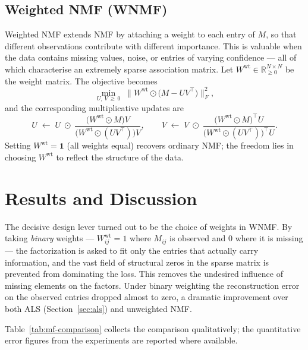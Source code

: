 \subsection{Weighted NMF (WNMF)}
\label{sec:wnmf}
Weighted NMF extends NMF by attaching a weight to each entry of $M$, so that
different observations contribute with different importance. This is valuable
when the data contains missing values, noise, or entries of varying
confidence --- all of which characterise an extremely sparse association
matrix. Let $W^{\mathrm{wt}} \in \mathbb{R}^{N\times N}_{\ge 0}$ be the weight
matrix. The objective becomes
\begin{equation}
  \label{eq:wnmf-obj}
  \min_{U,\,V \,\ge\, 0}\;
    \bigl\| W^{\mathrm{wt}} \odot \bigl(M - U V^{\top}\bigr) \bigr\|_{F}^{2},
\end{equation}
and the corresponding multiplicative updates are
\begin{equation}
  \label{eq:wnmf-update}
  U \;\leftarrow\; U \;\odot\;
    \frac{\bigl(W^{\mathrm{wt}}\odot M\bigr) V}
         {\bigl(W^{\mathrm{wt}}\odot (U V^{\top})\bigr) V},
  \qquad
  V \;\leftarrow\; V \;\odot\;
    \frac{\bigl(W^{\mathrm{wt}}\odot M\bigr)^{\top} U}
         {\bigl(W^{\mathrm{wt}}\odot (U V^{\top})\bigr)^{\top} U}.
\end{equation}
Setting $W^{\mathrm{wt}} = \mathbf{1}$ (all weights equal) recovers ordinary
NMF; the freedom lies in choosing $W^{\mathrm{wt}}$ to reflect the structure of
the data.

\section{Results and Discussion}
\label{sec:mf-results}

The decisive design lever turned out to be the choice of weights in WNMF. By
taking \emph{binary} weights --- $W^{\mathrm{wt}}_{ij} = 1$ where $M_{ij}$ is
observed and $0$ where it is missing --- the factorization is asked to fit only
the entries that actually carry information, and the vast field of structural
zeros in the sparse matrix is prevented from dominating the loss. This removes
the undesired influence of missing elements on the factors. Under binary
weighting the reconstruction error on the observed entries dropped almost to
zero, a dramatic improvement over both ALS (Section~\ref{sec:als}) and
unweighted NMF.

Table~\ref{tab:mf-comparison} collects the comparison qualitatively; the
quantitative error figures from the experiments are reported where available.

